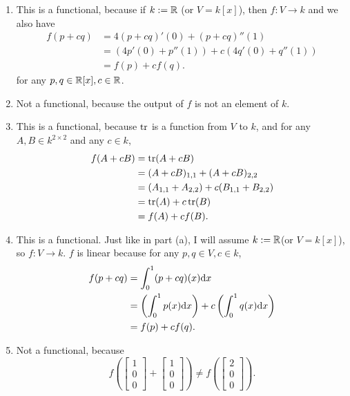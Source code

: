 \documentclass{article}
\begin{document}
\bigskip
\begin{prob}
\end{prob}
\begin{enumerate}[label=(\alph*)]
    \item This is a functional, because if $k:=\mathbb{R}$ (or $V=k[x]$), then $f: V \rightarrow k$ and we also have
        \begin{align*}
            f(p+cq) &= 4(p+cq)'(0)+(p+cq)''(1) \\
                    &= (4p'(0)+p''(1))+c(4q'(0)+q''(1)) \\
                    &= f(p)+cf(q).
        \end{align*}
        for any $p, q \in \mathbb{R}[x], c \in \mathbb{R}$.
    \item Not a functional, because the output of $f$ is not an element of $k$.
    \item This is a functional, because $\operatorname{tr}$ is a function from $V$ to $k$, and for any $A,B \in k^{2 \times 2}$ and any $c \in k$,
        \begin{align*}
            f(A+cB) &= \operatorname{tr}(A+cB) \\
                    &= (A+cB)_{1,1}+(A+cB)_{2,2} \\
                    &= (A_{1,1}+A_{2,2})+c(B_{1,1}+B_{2,2}) \\
                    &= \operatorname{tr}(A)+c\operatorname{tr}(B) \\
                    &= f(A)+cf(B).
        \end{align*}
    \item This is a functional. Just like in part (a), I will assume $k := \mathbb{R}$(or $V=k[x]$), so $f: V \rightarrow k$. $f$ is linear because for any $p,q \in V, c \in k$,
        \begin{align*}
            f(p+cq) &= \int_0^1 (p+cq)(x) \mathrm{d} x \\
                    &= \left( \int_0^1 p(x) \mathrm{d} x \right) + c \left( \int_0^1 q(x) \mathrm{d} x \right) \\
                    &= f(p)+cf(q).
        \end{align*}
    \item Not a functional, because
        \[ f \left( \begin{bmatrix}
            1 \\
            0 \\
            0
        \end{bmatrix} + \begin{bmatrix}
            1 \\
            0 \\
            0
    \end{bmatrix} \right) \neq f \left( \begin{bmatrix}
        2 \\
        0 \\
        0
    \end{bmatrix} \right). \]
        
\end{enumerate}
\end{document}
